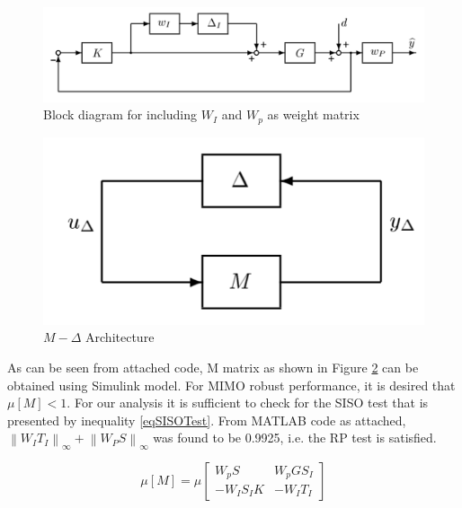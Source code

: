 \documentclass[12pt]{article}
\newcommand{\norm}[1]{\left\lVert#1\right\rVert}
\begin{document}
	\begin{figure}[H]
		\centering
		\includegraphics[width=0.8\linewidth]{WIWP}
		\caption{Block diagram for including $W_I$ and $W_p$ as weight matrix}
		\label{fig:wiwp}
	\end{figure}
	
	\begin{figure}[H]
		\centering
		\includegraphics[width=0.4\linewidth]{MD}
		\caption{$M-\Delta$ Architecture}
		\label{fig:md}
	\end{figure}
	
	\noindent As can be seen from attached code, M matrix as shown in Figure \ref{fig:md} can be obtained using Simulink model. For MIMO robust performance, it is desired that $\mu[M] < 1$. For our analysis it is sufficient to check for the SISO test that is presented by inequality \ref{eqSISOTest}. From MATLAB code as attached, $\norm{W_I T_{I}}_{\infty} + \norm{W_P S}_{\infty}$  was found to be 0.9925, i.e. the RP test is satisfied.
	
	\begin{equation}
	\mu[M] = \mu\begin{bmatrix}
	W_p S & W_p G S_I \\
	-W_I S_I K & -W_I T_I
	\end{bmatrix}
	\end{equation}
	
\end{document}
